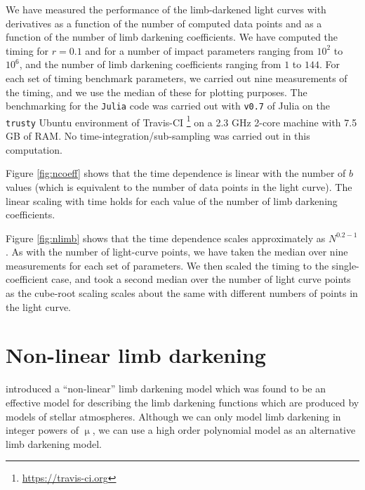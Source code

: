 \documentclass[modern]{aastex61}
\begin{document}
We have measured the performance of the limb-darkened light curves
with derivatives as a function of the number of computed data points
and as a function of the number of limb darkening coefficients.  We
have computed the timing for $r=0.1$ and for a number of impact
parameters ranging from $10^2$ to $10^6$, and the number of limb darkening
coefficients ranging from $1$ to $144$.  For each set of timing benchmark
parameters, we carried out nine measurements  of the timing, and
we use the median of these for plotting purposes.  The benchmarking
for the \texttt{Julia} code was carried out with \texttt{v0.7} of
Julia on the \texttt{trusty} Ubuntu environment of Travis-CI%
\footnote{\url{https://travis-ci.org}}
on a 2.3 GHz
2-core machine with 7.5 GB of RAM.
No time-integration/sub-sampling was carried out in this computation.

Figure \ref{fig:ncoeff} shows that the time dependence is linear with the
number of $b$ values (which is equivalent to the number of data points
in the light curve).  The linear scaling with time holds for each value of
the number of limb darkening coefficients.

Figure \ref{fig:nlimb} shows that the time dependence scales approximately
as $N^{0.2-1}$.  As with the number of light-curve points, we have taken
the median over nine measurements for each set of parameters.  We then
scaled the timing to the single-coefficient case, and took a second
median over the number of light curve points as the cube-root scaling scales
about the same with different numbers of points in the light curve.

\section{Non-linear limb darkening}\label{sec:nonlinear}


\citet{Claret2000} introduced a ``non-linear'' limb darkening model which
was found to be an effective model for describing the limb darkening functions
which are produced by models of stellar atmospheres.
Although we can only model limb darkening in integer powers of $\upmu$,
we can use a high order polynomial model as an alternative limb darkening model.
\end{document}

